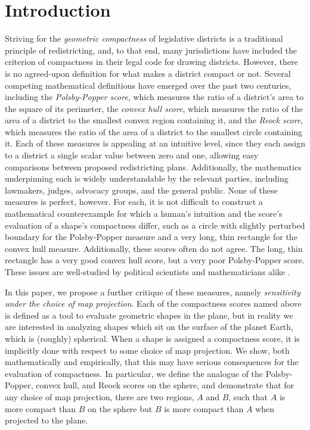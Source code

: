 \section{Introduction}\label{sec:intro}

Striving for the \textit{geometric compactness} of legislative
districts is a traditional principle of redistricting, and, to that
end, many jurisdictions have included the criterion of compactness in
their legal code for drawing districts.  However, there is no
agreed-upon definition for what makes a district compact or not.
Several competing mathematical definitions have emerged over the past
two centuries, including the \textit{Polsby-Popper score}, which
measures the ratio of a district's area to the square of its
perimeter,  the \textit{convex hull score}, which measures the ratio
of the area of a district to the smallest convex region containing it,
and the \textit{Reock score}, which measures the ratio of the area of
a district to the smallest circle containing it.  Each of these
measures is appealing at an intuitive level, since they each assign to
a district a single scalar value between zero and one, allowing easy
comparisons between proposed redistricting plans. Additionally, the
mathematics underpinning each is widely understandable by the relevant
parties, including lawmakers, judges, advocacy groups, and the general
public.  None of these measures is perfect, however.  For each, it is
not difficult to construct a mathematical counterexample for which
a human's intuition and the score's evaluation of a shape's
compactness differ, such as a circle with slightly perturbed boundary
for the Polsby-Popper measure and a very long, thin rectangle for the
convex hull measure.  Additionally, these scores often do not agree.
The long, thin rectangle has a very good convex hull score, but a very
poor Polsby-Popper score.  These issues are well-studied by political
scientists and mathematicians alike
\cite{polsby1991third,frolov1975shape,maceachren1985compact}.

In this paper, we propose a further critique of these measures, namely
\textit{sensitivity under the choice of map projection}.  Each of the
compactness scores named above is defined as a tool to evaluate
geometric shapes in the plane, but in reality we are interested in
analyzing shapes which sit on the surface of the planet Earth, which
is (roughly) spherical.  When a shape is assigned a compactness score,
it is implicitly done with respect to some choice of map projection.
We show, both mathematically and empirically, that this may have
serious consequences for the evaluation of compactness.  In
particular, we define the analogue of the Polsby-Popper, convex hull,
and Reock scores on the sphere, and demonstrate that for any choice of
map projection, there are two regions, $A$ and $B$, such that $A$ is
more compact than $B$ on the sphere but $B$ is more compact than $A$
when projected to the plane.
